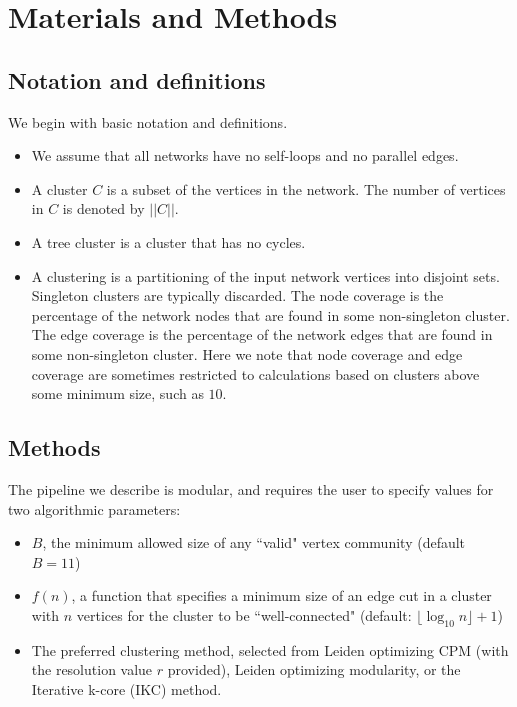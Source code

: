 \documentclass[11pt]{article}   	%
\begin{document}

\section{Materials and Methods}

\subsection{Notation and definitions}
We begin with basic notation and definitions.
\begin{itemize}
\item We assume that all networks have no self-loops and no parallel edges.
\item A cluster $C$ is a subset of the vertices in the network. The number of vertices in $C$ is denoted by $||C||$.
\item A tree cluster is a cluster that has no cycles.
\item A clustering is a partitioning of the input network vertices into disjoint sets.  Singleton clusters are typically
discarded.  The node coverage is the percentage of the network nodes that are found in some non-singleton cluster.
The edge coverage is the percentage of the network edges that are found in some non-singleton cluster.
Here we note that node coverage and edge coverage are sometimes restricted to calculations based on clusters above some minimum size, such as $10$.
\end{itemize}

\subsection{Methods}
The pipeline we describe is modular, and requires the user to specify values for two algorithmic parameters:
\begin{itemize}
\item $B$, the minimum allowed size of any ``valid" vertex community (default $B=11$)
\item $f(n)$, a function that specifies a minimum size of an edge cut in a cluster with $n$ vertices  for the cluster to be ``well-connected" (default: $ \lfloor \log_{10} n \rfloor +1$)
\item The preferred clustering method, selected from Leiden optimizing CPM (with the resolution value $r$ provided), Leiden optimizing modularity, or the Iterative k-core (IKC) method.
\end{itemize}
\end{document}
